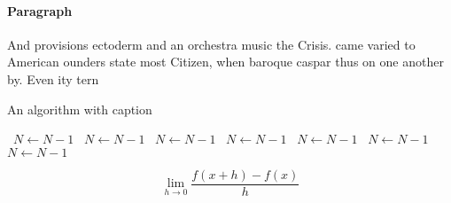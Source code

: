 \documentclass[a4paper]{article}
\begin{document}
\paragraph{Paragraph}
And provisions ectoderm and an orchestra music the Crisis. came varied to American ounders state most Citizen, when baroque caspar thus on one another by. Even ity tern 


\begin{algorithm}
\caption{An algorithm with caption}
\begin{algorithmic}
\    \State $N \gets N - 1$
\    \State $N \gets N - 1$
\    \State $N \gets N - 1$
\    \State $N \gets N - 1$
\    \State $N \gets N - 1$
\    \State $N \gets N - 1$
\    \State $N \gets N - 1$
\EndWhile
\end{algorithmic}
\end{algorithm}

\[\lim_{h \rightarrow 0 } \frac{f(x+h)-f(x)}{h}\]
\end{document}
